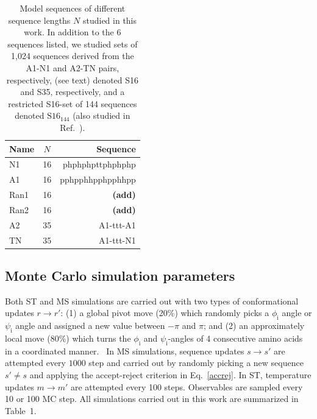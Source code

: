 \documentclass[%
 aip,
rsi,%
 amsmath,amssymb,
 reprint,%
]{revtex4-1}
\newcommand	 {\sbar}	{{s}}
\newcommand	 {\rbar}	{{r}}
\begin{document}
\begin{table}
\caption{\label{tab:table1} Model sequences of different sequence lengths $N$ studied in this work. In addition to the 6 sequences listed, we studied sets of 1,024 sequences derived from the A1-N1 and A2-TN pairs, respectively, (see text) denoted S16 and S35, respectively, and a restricted S16-set of 144 sequences denoted $\mathrm{S16}_{144}$ (also studied in Ref.~\protect\citep{Holzgrafe2014}).  }
\begin{ruledtabular}
\begin{tabular}{lcr}
Name & $N$ & Sequence\\
\hline
N1 & 16 & phphphpttphphphp \\
A1 & 16 & pphpphhpphpphhpp \\
Ran1 & 16 & \textbf{(add)}\\
Ran2 & 16 &  \textbf{(add)}\\
A2 & 35 & A1-ttt-A1\\
TN & 35 & A1-ttt-N1\\
\end{tabular}
\end{ruledtabular}
\end{table}


\subsection{Monte Carlo simulation parameters}
\noindent
Both ST and MS simulations are carried out with two types of conformational updates $\rbar\rightarrow\rbar'$: (1) a global pivot move (20\%) which randomly picks a $\phi_\mathrm{i}$ angle or $\psi_\mathrm{i}$ angle and assigned a new value between $-\pi$ and $\pi$; and (2) an approximately local move (80\%) which turns the $\phi_\mathrm{i}$ and $\psi_\mathrm{i}$-angles of 4 consecutive amino acids in a coordinated manner.~\cite{Favrin2003} In MS simulations, sequence updates $\sbar\rightarrow\sbar'$ are attempted every $1000$ step and carried out by randomly picking a new sequence $\sbar'\ne\sbar$ and applying the accept-reject criterion in Eq.~\ref{accrej}. In ST, temperature updates $m\rightarrow m'$ are attempted every 100 steps. Observables are sampled every 10 or 100 MC step. All simulations carried out in this work are summarized in Table~1. 
\end{document}
